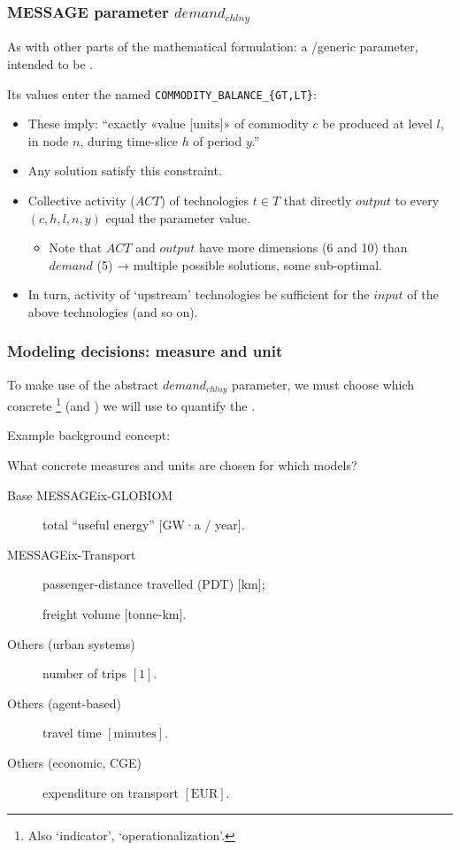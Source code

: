 \documentclass[12pt,aspectratio=169]{beamer}
\begin{document}
\begin{frame}
\frametitle{MESSAGE parameter $demand_{chlny}$}

As with other parts of the mathematical formulation: a /generic parameter, intended to be .

\bigskip
Its values enter the  named \texttt{COMMODITY\_BALANCE\_\{GT,LT\}}:
\begin{itemize}[<+->]
  \item These imply: “exactly «value [units]» of commodity $c$  be produced at level $l$, in node $n$, during time-slice $h$ of period $y$.”
  \item Any solution  satisfy this constraint.
  \item Collective activity ($ACT$) of technologies $t \in T$ that directly $output$ to every $(c, h, l, n, y)$  equal the parameter value.
    \begin{itemize}
      \item Note that $ACT$ and $output$ have more dimensions (6 and 10) than $demand$ (5) → multiple possible solutions, some sub-optimal.
    \end{itemize}
  \item In turn, activity of ‘upstream’ technologies  be sufficient for the $input$ of the above technologies (and so on).
\end{itemize}

\end{frame}

\begin{frame}
\frametitle{Modeling decisions: measure and unit}

To make use of the abstract $demand_{chlny}$ parameter, we must choose
which concrete \footnote{Also ‘indicator’, ‘operationalization’.} (and ) we will use to quantify the .

\bigskip
Example background concept: 

What concrete measures and units are chosen for which models?

\begin{description}
  \item [Base MESSAGEix-GLOBIOM] total “useful energy” [GW·a / year].
  \item [MESSAGEix-Transport] passenger-distance travelled (PDT) [km];

    freight volume [tonne-km].
  \item [Others (urban systems)] number of trips $[1]$.
  \item [Others (agent-based)] travel time $[\text{minutes}]$.
  \item [Others (economic, CGE)] expenditure on transport $[\text{EUR}]$.
\end{description}
\end{frame}
\end{document}
